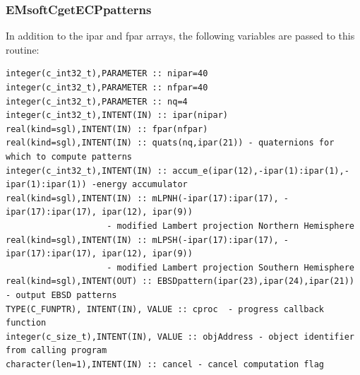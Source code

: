 \documentclass[DIV=calc, paper=letter, fontsize=11pt]{scrartcl}	 %
\begin{document}
\subsubsection{EMsoftCgetECPpatterns}
In addition to the \textsf{ipar} and \textsf{fpar} arrays, the following variables are 
passed to this routine:
{\footnotesize\begin{verbatim}
integer(c_int32_t),PARAMETER :: nipar=40
integer(c_int32_t),PARAMETER :: nfpar=40
integer(c_int32_t),PARAMETER :: nq=4
integer(c_int32_t),INTENT(IN) :: ipar(nipar)
real(kind=sgl),INTENT(IN) :: fpar(nfpar)
real(kind=sgl),INTENT(IN) :: quats(nq,ipar(21)) - quaternions for which to compute patterns
integer(c_int32_t),INTENT(IN) :: accum_e(ipar(12),-ipar(1):ipar(1),-ipar(1):ipar(1)) -energy accumulator
real(kind=sgl),INTENT(IN) :: mLPNH(-ipar(17):ipar(17), -ipar(17):ipar(17), ipar(12), ipar(9))
					- modified Lambert projection Northern Hemisphere
real(kind=sgl),INTENT(IN) :: mLPSH(-ipar(17):ipar(17), -ipar(17):ipar(17), ipar(12), ipar(9))
					- modified Lambert projection Southern Hemisphere
real(kind=sgl),INTENT(OUT) :: EBSDpattern(ipar(23),ipar(24),ipar(21)) - output EBSD patterns
TYPE(C_FUNPTR), INTENT(IN), VALUE :: cproc  - progress callback function
integer(c_size_t),INTENT(IN), VALUE :: objAddress - object identifier from calling program
character(len=1),INTENT(IN) :: cancel - cancel computation flag
\end{verbatim}}
\end{document}
